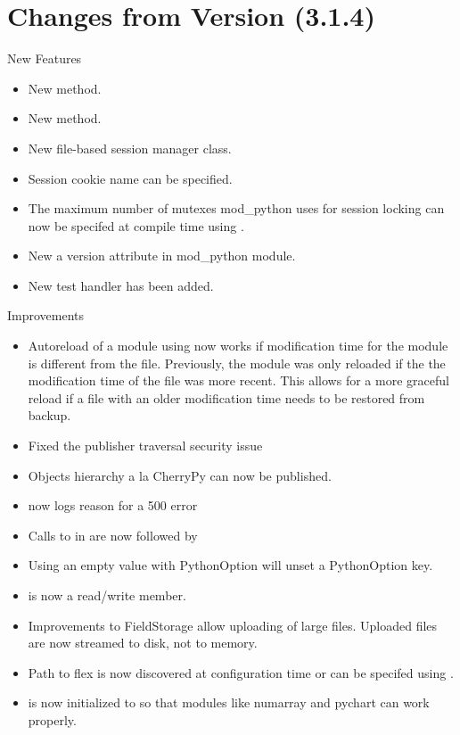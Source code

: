 \chapter{Changes from Version (3.1.4)\label{app-changes-from-3.1.4}}

  
  New Features

  \begin{itemize}
    \item
      New  method.
    \item
      New  method.
    \item
      New file-based session manager class.
    \item
      Session cookie name can be specified.
    \item
      The maximum number of mutexes mod_python uses for session locking
      can now be specifed at compile time using 
      .
    \item
      New a version attribute in mod_python module.
    \item
      New test handler  has been added.
  \end{itemize}

  Improvements

  \begin{itemize}
    \item
      Autoreload of a module using  now works if
      modification time for the module is different from the file.
      Previously, the module was only reloaded if the the modification 
      time of the file was more recent. This allows for a more graceful
      reload if a file with an older modification time needs to be
      restored from backup.
    \item
      Fixed the publisher traversal security issue
    \item
      Objects hierarchy a la CherryPy can now be published.
    \item
       now logs reason for a 500 error
    \item
      Calls to  in  are now followed by 
    \item
      Using an empty value with PythonOption will unset a PythonOption key.
    \item
       is now a read/write member.
    \item
      Improvements to FieldStorage allow uploading of large files. Uploaded
      files are now streamed to disk, not to memory.
    \item
      Path to flex is now discovered at configuration time or can be
      specifed using .
    \item
       is now initialized to  so that modules
      like numarray and pychart can work properly.
  \end{itemize}

